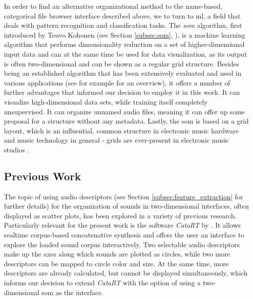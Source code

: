 \smallskip

In order to find an alternative organizational method to the name-based,
categorical file browser interface described above, we to turn to \gls{ml},
a field that deals with pattern recognition and classification tasks. The
\textit{\gls{som}} algorithm, first introduced by Teuvo Kohonen (see Section
\ref{subsec:som}, \citet{kohonen1990}), is a machine learning algorithm that
performs dimensionality reduction on a set of higher-dimensional input data and
can at the same time be used for data visualization, as its output is often
two-dimensional and can be shown as a regular grid structure. Besides being an
established algorithm that has been extensively evaluated and used in various
applications (see for example \citet[p.1476]{kohonen1990} for an overview), it
offers a number of further advantages that informed our decision to employ it
in this work. It can visualize high-dimensional data sets, while training itself
completely unsupervised. It can organize unnamed audio files, meaning it can
offer up some proposal for a structure without any metadata. Lastly, the
\gls{som} is based on a grid layout, which is an influential, common structure
in electronic music hardware and music technology in general - grids are
ever-present in electronic music studios \citep{adeney2009}.


\subsection{Previous Work}
\label{subsec:previous_work}
The topic of using audio descriptors (see Section
\ref{subsec:feature_extraction} for further details) for the organization of
sounds in two-dimensional interfaces, often displayed as scatter plots, has
been explored in a variety of previous research. Particularly relevant for the
present work is the software \textit{CataRT} by \citet{schwarz2006}. It allows
realtime corpus-based concatenative synthesis and offers the user an interface
to explore
the loaded sound corpus interactively. Two selectable audio descriptors make up
the axes along which sounds are plotted as circles, while two more descriptors
can be mapped to circle color and size. At the same time, more descriptors are
already calculated, but cannot be displayed simultaneously, which informs our
decision to extend \textit{CataRT} with the option of using a two-dimensional
\gls{som} as the interface.


